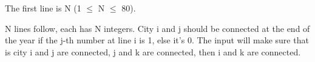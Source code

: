 The first line is N (1  $\le$  N  $\le$  80).  

   N lines follow, each has N integers. City i and j should be connected at the end of the year if the j-th number at line i is 1, else it's 0. The input will make sure that is city i and j are connected, j and k are connected, then i and k are connected.